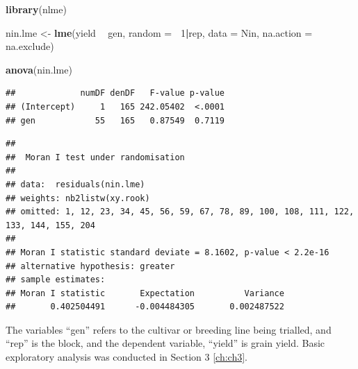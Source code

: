 \documentclass[]{book}
\newenvironment{Shaded}{\begin{snugshade}}{\end{snugshade}}
\newcommand{\DataTypeTok}[1]{\textcolor[rgb]{0.13,0.29,0.53}{#1}}
\newcommand{\DecValTok}[1]{\textcolor[rgb]{0.00,0.00,0.81}{#1}}
\newcommand{\KeywordTok}[1]{\textcolor[rgb]{0.13,0.29,0.53}{\textbf{#1}}}
\newcommand{\NormalTok}[1]{#1}
\newcommand{\OperatorTok}[1]{\textcolor[rgb]{0.81,0.36,0.00}{\textbf{#1}}}
\newcommand{\StringTok}[1]{\textcolor[rgb]{0.31,0.60,0.02}{#1}}
\begin{document}
\begin{Shaded}
\begin{Highlighting}[]
\KeywordTok{library}\NormalTok{(nlme)}

\NormalTok{nin.lme <-}\StringTok{ }\KeywordTok{lme}\NormalTok{(yield }\OperatorTok{~}\StringTok{ }\NormalTok{gen, }\DataTypeTok{random =} \OperatorTok{~}\DecValTok{1}\OperatorTok{|}\NormalTok{rep,}
              \DataTypeTok{data =}\NormalTok{ Nin,}
              \DataTypeTok{na.action =}\NormalTok{ na.exclude)}

\KeywordTok{anova}\NormalTok{(nin.lme)}
\end{Highlighting}
\end{Shaded}

\begin{verbatim}
##             numDF denDF   F-value p-value
## (Intercept)     1   165 242.05402  <.0001
## gen            55   165   0.87549  0.7119
\end{verbatim}

\begin{Shaded}
\end{Shaded}

\begin{verbatim}
## 
##  Moran I test under randomisation
## 
## data:  residuals(nin.lme)  
## weights: nb2listw(xy.rook) 
## omitted: 1, 12, 23, 34, 45, 56, 59, 67, 78, 89, 100, 108, 111, 122, 133, 144, 155, 204   
## 
## Moran I statistic standard deviate = 8.1602, p-value < 2.2e-16
## alternative hypothesis: greater
## sample estimates:
## Moran I statistic       Expectation          Variance 
##       0.402504491      -0.004484305       0.002487522
\end{verbatim}

The variables ``gen'' refers to the cultivar or breeding line being trialled, and ``rep'' is the block, and the dependent variable, ``yield'' is grain yield. Basic exploratory analysis was conducted in Section 3 \ref{ch:ch3}.
\end{document}
